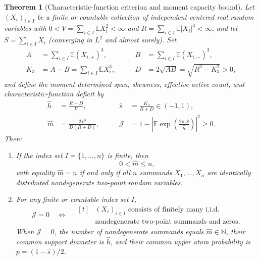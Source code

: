 \documentclass[11pt]{article}
\numberwithin{equation}{section}
\newtheorem{theorem}{Theorem}[section]
\theoremstyle{definition}
\theoremstyle{remark}
\newcommand{\E}{\mathbb E}
\newcommand{\N}{\mathbb N}
\newcommand{\ii}{\mathrm i}
\begin{document}
\begin{theorem}[Characteristic-function criterion and moment capacity bound]\label{thm:fourier-criterion}
Let $(X_i)_{i\in I}$ be a finite or countable collection of independent
centered real random variables with $0<V=\sum_{i\in I}\E X_i^2<\infty$ and
$R=\sum_{i\in I}\E|X_i|^3<\infty$, and let $S=\sum_{i\in I}X_i$ (converging
in $L^2$ and almost surely). Set
\begin{equation}\label{eq:moment-aggregates}
\begin{aligned}
 A&=\sum_{i\in I}\E(X_{i,+})^3,&
 B&=\sum_{i\in I}\E(X_{i,-})^3,\\
 K_3&=A-B=\sum_{i\in I}\E X_i^3,\qquad&
 D&=2\sqrt{AB}=\sqrt{R^2-K_3^2}>0,
\end{aligned}
\end{equation}
and define the moment-determined span, skewness, effective active count, and
characteristic-function deficit by
\begin{equation}\label{eq:endogenous-quantities}
\begin{aligned}
 \widehat h&=\frac{R+D}{V},&
 \widehat s&=\frac{K_3}{R+D}\in(-1,1),\\
 \widehat m&=\frac{2V^3}{D(R+D)},\qquad&
 \mathcal J&=1-\left|\E\exp\!\left(\frac{2\pi\ii S}{\widehat h}\right)\right|^2\ge0.
\end{aligned}
\end{equation}
Then:
\begin{enumerate}[label=(\roman*),leftmargin=2em]
\item\label{it:mhat-bound} If the index set $I=\{1,\ldots,n\}$ is finite, then
\begin{equation}\label{eq:mhat-le-n}
 0<\widehat m\le n,
\end{equation}
with equality $\widehat m=n$ if and only if all $n$ summands $X_1,\ldots,X_n$
are identically distributed nondegenerate two-point random variables.

\item\label{it:j-zero} For any finite or countable index set $I$,
\begin{equation}\label{eq:j-zero-equiv}
 \mathcal J=0
 \quad\Longleftrightarrow\quad
 \begin{aligned}[t]
 &(X_i)_{i\in I}\text{ consists of finitely many i.i.d.}\\
 &\text{nondegenerate two-point summands and zeros.}
 \end{aligned}
\end{equation}
When $\mathcal J=0$, the number of nondegenerate summands equals
$\widehat m\in\N$, their common support diameter is $\widehat h$, and their
common upper atom probability is $p=(1-\widehat s)/2$.


\end{enumerate}
\end{theorem}
\end{document}
